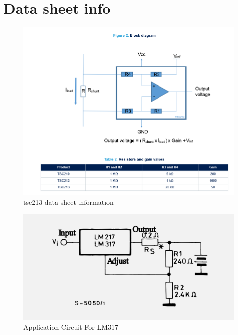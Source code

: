      \chapter{Data sheet info}

\begin{figure}[!htb]
\centering
\includegraphics[scale=0.5]{./Figures/datasheet}
\caption{tsc213 data sheet information}
\label{fig:data}
\end{figure}


\begin{figure}[!htb]
\centering
\includegraphics[scale=0.35]{Figures/circuitSTM.png}
\caption[Application Circuit For LM317]{Application Circuit For LM317\cite{STM}}
\label{fig:app}
\end{figure}




